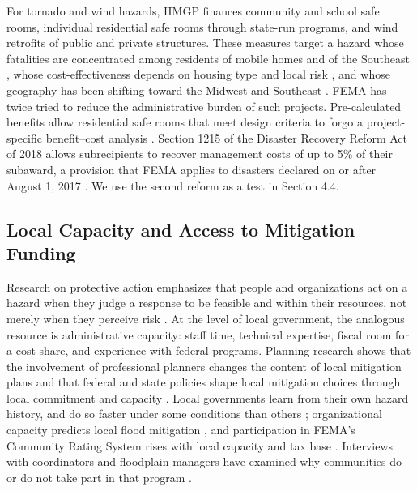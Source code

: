 \documentclass[12pt]{article}
\begin{document}
For tornado and wind hazards, HMGP finances community and school safe rooms, individual residential safe rooms through state-run programs, and wind retrofits of public and private structures. These measures target a hazard whose fatalities are concentrated among residents of mobile homes and of the Southeast \parencite{ashley2007fatalities,sutter2010mobile}, whose cost-effectiveness depends on housing type and local risk \parencite{merrell2005casualties,simmons2006shelters}, and whose geography has been shifting toward the Midwest and Southeast \parencite{gensini2018trends}. FEMA has twice tried to reduce the administrative burden of such projects. Pre-calculated benefits allow residential safe rooms that meet design criteria to forgo a project-specific benefit--cost analysis \parencite{fema2015saferoomprecalc,fema2024bcapolicy}. Section 1215 of the Disaster Recovery Reform Act of 2018 \parencite{drra2018} allows subrecipients to recover management costs of up to 5\% of their subaward, a provision that FEMA applies to disasters declared on or after August 1, 2017 \parencite{fema1215mgmtcosts}. We use the second reform as a test in Section 4.4.

\subsection{Local Capacity and Access to Mitigation Funding}

Research on protective action emphasizes that people and organizations act on a hazard when they judge a response to be feasible and within their resources, not merely when they perceive risk \parencite{lindell2012padm,bubeck2012review}. At the level of local government, the analogous resource is administrative capacity: staff time, technical expertise, fiscal room for a cost share, and experience with federal programs. Planning research shows that the involvement of professional planners changes the content of local mitigation plans \parencite{lyles2014planners} and that federal and state policies shape local mitigation choices through local commitment and capacity \parencite{burby2006katrina,berke2014impacts}. Local governments learn from their own hazard history, and do so faster under some conditions than others \parencite{brody2009policy}; organizational capacity predicts local flood mitigation \parencite{brody2010identifying}, and participation in FEMA's Community Rating System rises with local capacity and tax base \parencite{posey2009determinants,sadiq2015local,li2018flood}. Interviews with coordinators and floodplain managers have examined why communities do or do not take part in that program \parencite{sadiq2020participation}.
\end{document}
